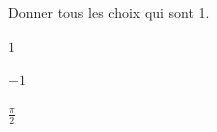 \documentclass[12pt]{exam}
\begin{document}
\begin{questions}
\vspace{1em}





\question Donner tous les choix qui sont 1.



\begin{choices}

  
    \CorrectChoice $1$
  

  
    \choice $-1$
  

  
    \choice $\tfrac{\pi}{2}$
  

\end{choices}









\vspace{1em}



\end{questions}
\end{document}
